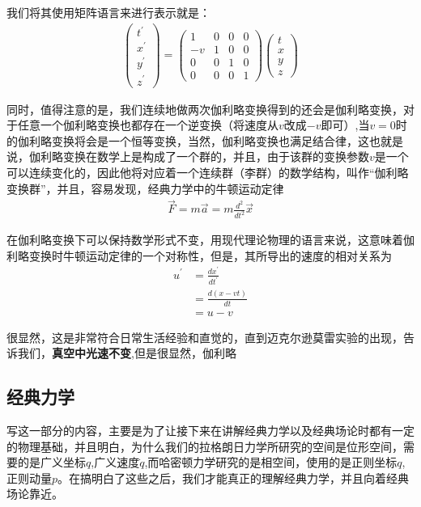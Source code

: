 \documentclass{article}
\begin{document}
我们将其使用矩阵语言来进行表示就是：
\begin{align*}
    \begin{pmatrix}
        t^\prime\\x^\prime\\y^\prime\\z^\prime
    \end{pmatrix}
    =
    \begin{pmatrix}
        1&0&0&0\\
        -v&1&0&0\\
        0&0&1&0\\
        0&0&0&1
    \end{pmatrix}
    \begin{pmatrix}
        t\\x\\y\\z
    \end{pmatrix}
\end{align*}

同时，值得注意的是，我们连续地做两次伽利略变换得到的还会是伽利略变换，对于任意一个伽利略变换也都存在一个逆变换（将速度从$v$改成$-v$即可）,当$v=0$时的伽利略变换将会是一个恒等变换，当然，伽利略变换也满足结合律，这也就是说，伽利略变换在数学上是构成了一个群的，并且，由于该群的变换参数$v$是一个可以连续变化的，因此他将对应着一个连续群（李群）的数学结构，叫作“伽利略变换群”，并且，容易发现，经典力学中的牛顿运动定律
\begin{align*}
    \vec{F}=m\vec{a}=m\frac{d^2}{dt^2}\vec{x}
\end{align*}

在伽利略变换下可以保持数学形式不变，用现代理论物理的语言来说，这意味着伽利略变换时牛顿运动定律的一个对称性，但是，其所导出的速度的相对关系为
\begin{align*}
    u^\prime&=\frac{d x^\prime}{dt^\prime}\\
    &=\frac{d(x-vt)}{dt}\\
    &=u-v
\end{align*}

很显然，这是非常符合日常生活经验和直觉的，直到迈克尔逊莫雷实验的出现，告诉我们，\textbf{真空中光速不变},但是很显然，伽利略


\subsection{经典力学}
写这一部分的内容，主要是为了让接下来在讲解经典力学以及经典场论时都有一定的物理基础，并且明白，为什么我们的拉格朗日力学所研究的空间是位形空间，需要的是广义坐标$q$,广义速度$\dot{q}$,而哈密顿力学研究的是相空间，使用的是正则坐标$q$,正则动量$p$。在搞明白了这些之后，我们才能真正的理解经典力学，并且向着经典场论靠近。
\end{document}
